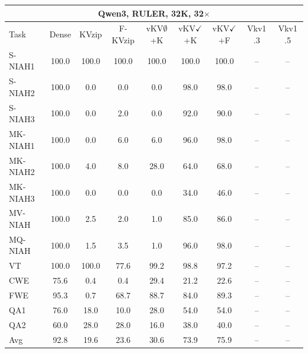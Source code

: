 \begin{tabular}{lcccccccc}
\toprule
\multicolumn{9}{c}{Qwen3, RULER, 32K, 32$\times$} \\
\midrule
Task & Dense & KVzip & F-KVzip & vKV$\emptyset$+K & vKV$\checkmark$+K & vKV$\checkmark$+F & Vkv1 .3 & Vkv1 .5 \\
\midrule
S-NIAH1 & 100.0 & 100.0 & 100.0 & 100.0 & 100.0 & 100.0 & -- & -- \\
S-NIAH2 & 100.0 & 0.0 & 0.0 & 0.0 & 98.0 & 98.0 & -- & -- \\
S-NIAH3 & 100.0 & 0.0 & 2.0 & 0.0 & 92.0 & 90.0 & -- & -- \\
MK-NIAH1 & 100.0 & 0.0 & 6.0 & 6.0 & 96.0 & 98.0 & -- & -- \\
MK-NIAH2 & 100.0 & 4.0 & 8.0 & 28.0 & 64.0 & 68.0 & -- & -- \\
MK-NIAH3 & 100.0 & 0.0 & 0.0 & 0.0 & 34.0 & 46.0 & -- & -- \\
MV-NIAH & 100.0 & 2.5 & 2.0 & 1.0 & 85.0 & 86.0 & -- & -- \\
MQ-NIAH & 100.0 & 1.5 & 3.5 & 1.0 & 96.0 & 98.0 & -- & -- \\
VT & 100.0 & 100.0 & 77.6 & 99.2 & 98.8 & 97.2 & -- & -- \\
CWE & 75.6 & 0.4 & 0.4 & 29.4 & 21.2 & 22.6 & -- & -- \\
FWE & 95.3 & 0.7 & 68.7 & 88.7 & 84.0 & 89.3 & -- & -- \\
QA1 & 76.0 & 18.0 & 10.0 & 28.0 & 54.0 & 54.0 & -- & -- \\
QA2 & 60.0 & 28.0 & 28.0 & 16.0 & 38.0 & 40.0 & -- & -- \\
\midrule
Avg & 92.8 & 19.6 & 23.6 & 30.6 & 73.9 & 75.9 & -- & -- \\
\bottomrule
\end{tabular}
\vspace{0.8em}

